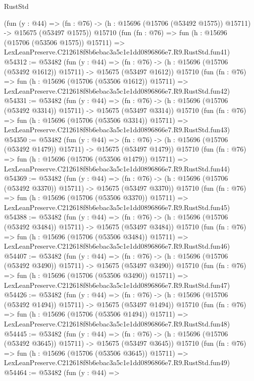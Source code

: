 \begin{lexlean}{RustStd}
\begin{coremodule}
    (fun (y : @44) =>
    (fn : @76) -> (h : @15696 (@15706 (@53492 @1575)) @15711) -> @15675 (@53497 @1575))
    @15710
    (fun (fn : @76) =>
    fun (h : @15696 (@15706 (@53506 @1575)) @15711) =>
    LexLeanPreserve.C212618f8b6ebac3a5c1e1dd0896866e7.R9.RustStd.fun41)
@54312 := @53482
    (fun (y : @44) =>
    (fn : @76) -> (h : @15696 (@15706 (@53492 @1612)) @15711) -> @15675 (@53497 @1612))
    @15710
    (fun (fn : @76) =>
    fun (h : @15696 (@15706 (@53506 @1612)) @15711) =>
    LexLeanPreserve.C212618f8b6ebac3a5c1e1dd0896866e7.R9.RustStd.fun42)
@54331 := @53482
    (fun (y : @44) =>
    (fn : @76) -> (h : @15696 (@15706 (@53492 @3314)) @15711) -> @15675 (@53497 @3314))
    @15710
    (fun (fn : @76) =>
    fun (h : @15696 (@15706 (@53506 @3314)) @15711) =>
    LexLeanPreserve.C212618f8b6ebac3a5c1e1dd0896866e7.R9.RustStd.fun43)
@54350 := @53482
    (fun (y : @44) =>
    (fn : @76) -> (h : @15696 (@15706 (@53492 @1479)) @15711) -> @15675 (@53497 @1479))
    @15710
    (fun (fn : @76) =>
    fun (h : @15696 (@15706 (@53506 @1479)) @15711) =>
    LexLeanPreserve.C212618f8b6ebac3a5c1e1dd0896866e7.R9.RustStd.fun44)
@54369 := @53482
    (fun (y : @44) =>
    (fn : @76) -> (h : @15696 (@15706 (@53492 @3370)) @15711) -> @15675 (@53497 @3370))
    @15710
    (fun (fn : @76) =>
    fun (h : @15696 (@15706 (@53506 @3370)) @15711) =>
    LexLeanPreserve.C212618f8b6ebac3a5c1e1dd0896866e7.R9.RustStd.fun45)
@54388 := @53482
    (fun (y : @44) =>
    (fn : @76) -> (h : @15696 (@15706 (@53492 @3484)) @15711) -> @15675 (@53497 @3484))
    @15710
    (fun (fn : @76) =>
    fun (h : @15696 (@15706 (@53506 @3484)) @15711) =>
    LexLeanPreserve.C212618f8b6ebac3a5c1e1dd0896866e7.R9.RustStd.fun46)
@54407 := @53482
    (fun (y : @44) =>
    (fn : @76) -> (h : @15696 (@15706 (@53492 @3490)) @15711) -> @15675 (@53497 @3490))
    @15710
    (fun (fn : @76) =>
    fun (h : @15696 (@15706 (@53506 @3490)) @15711) =>
    LexLeanPreserve.C212618f8b6ebac3a5c1e1dd0896866e7.R9.RustStd.fun47)
@54426 := @53482
    (fun (y : @44) =>
    (fn : @76) -> (h : @15696 (@15706 (@53492 @1494)) @15711) -> @15675 (@53497 @1494))
    @15710
    (fun (fn : @76) =>
    fun (h : @15696 (@15706 (@53506 @1494)) @15711) =>
    LexLeanPreserve.C212618f8b6ebac3a5c1e1dd0896866e7.R9.RustStd.fun48)
@54445 := @53482
    (fun (y : @44) =>
    (fn : @76) -> (h : @15696 (@15706 (@53492 @3645)) @15711) -> @15675 (@53497 @3645))
    @15710
    (fun (fn : @76) =>
    fun (h : @15696 (@15706 (@53506 @3645)) @15711) =>
    LexLeanPreserve.C212618f8b6ebac3a5c1e1dd0896866e7.R9.RustStd.fun49)
@54464 := @53482
    (fun (y : @44) =>

\end{coremodule}
\end{lexlean}
